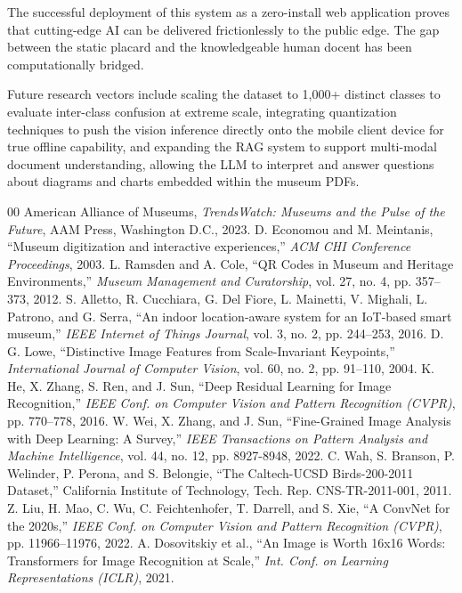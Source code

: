 \documentclass[conference]{IEEEtran}
\begin{document}
The successful deployment of this system as a zero-install web application proves that cutting-edge AI can be delivered frictionlessly to the public edge. The gap between the static placard and the knowledgeable human docent has been computationally bridged.

Future research vectors include scaling the dataset to 1,000+ distinct classes to evaluate inter-class confusion at extreme scale, integrating quantization techniques to push the vision inference directly onto the mobile client device for true offline capability, and expanding the RAG system to support multi-modal document understanding, allowing the LLM to interpret and answer questions about diagrams and charts embedded within the museum PDFs.

\begin{thebibliography}{00}
 American Alliance of Museums, \emph{TrendsWatch: Museums and the Pulse of the Future}, AAM Press, Washington D.C., 2023.
 D. Economou and M. Meintanis, ``Museum digitization and interactive experiences,'' \emph{ACM CHI Conference Proceedings}, 2003.
 L. Ramsden and A. Cole, ``QR Codes in Museum and Heritage Environments,'' \emph{Museum Management and Curatorship}, vol. 27, no. 4, pp. 357--373, 2012.
 S. Alletto, R. Cucchiara, G. Del Fiore, L. Mainetti, V. Mighali, L. Patrono, and G. Serra, ``An indoor location-aware system for an IoT-based smart museum,'' \emph{IEEE Internet of Things Journal}, vol. 3, no. 2, pp. 244--253, 2016.
 D. G. Lowe, ``Distinctive Image Features from Scale-Invariant Keypoints,'' \emph{International Journal of Computer Vision}, vol. 60, no. 2, pp. 91--110, 2004.
 K. He, X. Zhang, S. Ren, and J. Sun, ``Deep Residual Learning for Image Recognition,'' \emph{IEEE Conf. on Computer Vision and Pattern Recognition (CVPR)}, pp. 770--778, 2016.
 W. Wei, X. Zhang, and J. Sun, ``Fine-Grained Image Analysis with Deep Learning: A Survey,'' \emph{IEEE Transactions on Pattern Analysis and Machine Intelligence}, vol. 44, no. 12, pp. 8927-8948, 2022.
 C. Wah, S. Branson, P. Welinder, P. Perona, and S. Belongie, ``The Caltech-UCSD Birds-200-2011 Dataset,'' California Institute of Technology, Tech. Rep. CNS-TR-2011-001, 2011.
 Z. Liu, H. Mao, C. Wu, C. Feichtenhofer, T. Darrell, and S. Xie, ``A ConvNet for the 2020s,'' \emph{IEEE Conf. on Computer Vision and Pattern Recognition (CVPR)}, pp. 11966--11976, 2022.
 A. Dosovitskiy et al., ``An Image is Worth 16x16 Words: Transformers for Image Recognition at Scale,'' \emph{Int. Conf. on Learning Representations (ICLR)}, 2021.

\end{thebibliography}
\end{document}
